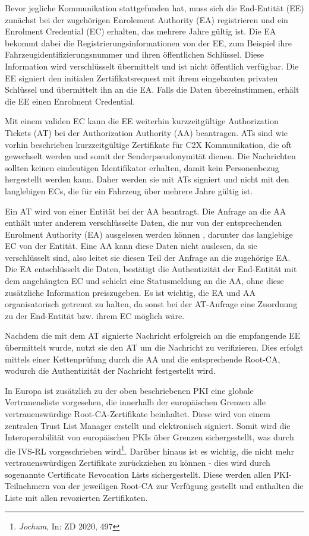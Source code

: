 Bevor jegliche Kommunikation stattgefunden hat, muss sich die End-Entität (EE) zunächst bei der zugehörigen Enrolement Authority (EA) registrieren und ein Enrolment Credential (EC) erhalten, das mehrere Jahre gültig ist. Die EA bekommt dabei die Registrierungsinformationen von der EE, zum Beispiel ihre Fahrzeugidentifizierungsnummer und ihren öffentlichen Schlüssel. Diese Information wird verschlüsselt übermittelt und ist nicht öffentlich verfügbar. Die EE signiert den initialen Zertifikatsrequest mit ihrem eingebauten privaten Schlüssel und übermittelt ihn an die EA. Falls die Daten übereinstimmen, erhält die EE einen Enrolment Credential.

Mit einem validen EC kann die EE weiterhin kurzzeitgültige Authorization Tickets (AT) bei der Authorization Authority (AA) beantragen. ATs sind wie vorhin beschrieben kurzzeitgültige Zertifikate für C2X Kommunikation, die oft gewechselt werden und somit der Senderpseudonymität dienen. Die Nachrichten sollten keinen eindeutigen Identifikator erhalten, damit kein Personenbezug hergestellt werden kann. Daher werden sie mit ATs signiert und nicht mit den langlebigen ECs, die für ein Fahrzeug über mehrere Jahre gültig ist. 

Ein AT wird von einer Entität bei der AA beantragt. Die Anfrage an die AA enthält unter anderem verschlüsselte Daten, die nur von der entsprechenden Enrolment Authority (EA) ausgelesen werden können \cite{ETSI2018}, darunter das langlebige EC von der Entität. Eine AA kann diese Daten nicht auslesen, da sie verschlüsselt sind, also leitet sie diesen Teil der Anfrage an die zugehörige EA. Die EA entschlüsselt die Daten, bestätigt die Authentizität der End-Entität mit dem angehängten EC und schickt eine Statusmeldung an die AA, ohne diese zusätzliche Information preiszugeben. Es ist wichtig, die EA und AA organisatorisch getrennt zu halten, da sonst bei der AT-Anfrage eine Zuordnung zu der End-Entität bzw. ihrem EC möglich wäre.

Nachdem die mit dem AT signierte Nachricht erfolgreich an die empfangende EE übermittelt wurde, nutzt sie den AT um die Nachricht zu verifizieren. Dies erfolgt mittels einer Kettenprüfung durch die AA und die entsprechende Root-CA, wodurch die Authentizität der Nachricht festgestellt wird.

In Europa ist zusätzlich zu der oben beschriebenen PKI eine globale Vertrauensliste vorgesehen, die innerhalb der europäischen Grenzen alle vertrauenswürdige Root-CA-Zertifikate beinhaltet. Diese wird von einem zentralen Trust List Manager erstellt und elektronisch signiert. Somit wird die Interoperabilität von europäischen PKIs über Grenzen sichergestellt, was durch die IVS-RL vorgeschrieben wird\footnote{\emph{Jochum}, In: ZD 2020, 497}. Darüber hinaus ist es wichtig, die nicht mehr vertrauenswürdigen Zertifikate zurückziehen zu können - dies wird durch sogenannte Certificate Revocation Lists sichergestellt. Diese werden allen PKI-Teilnehmern von der jeweiligen Root-CA zur Verfügung gestellt und enthalten die Liste mit allen revozierten Zertifikaten.  


